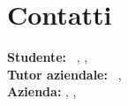 \section*{Contatti}
\textbf{Studente:} \nomeStudente\ \cognomeStudente, \href{mailto:\emailStudente}{\emailStudente}, \telStudente \\
\textbf{Tutor aziendale:} \nomeTutorAziendale\ \cognomeTutorAziendale, \href{mailto:\emailTutorAziendale}{\emailTutorAziendale}\\ %
\textbf{Azienda:} \ragioneSocAzienda, \indirizzoAzienda, \href{\sitoAzienda}{\sitoAzienda}